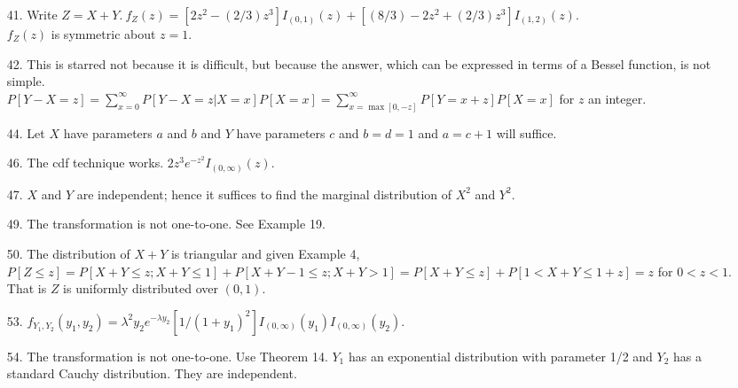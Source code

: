 \begin{enumerate}
	\item[41.] Write $Z=X+Y.\ f_Z(z) = [2z^2-(2/3)z^3]I_{(0,1)}(z) + [(8/3)-2z^2+(2/3)z^3]I_{(1,2)}(z)$. \\
	$f_Z(z)$ is symmetric about $z=1$.
	
	\item[42.] This is starred not because it is difficult, but because the answer, which can be expressed in terms of a Bessel function, is not simple. \\
	$P[Y-X=z] = \displaystyle\sum_{x=0}^{\infty}P[Y-X=z\vert X=x]P[X=x] = \sum_{x=\max[0,-z]}^{\infty} P[Y=x+z]P[X=x]$ for $z$ an integer.
	
	\newpage
	\item[44.] Let $X$ have parameters $a$ and $b$ and $Y$ have parameters $c$ and $b=d=1$ and $a=c+1$ will suffice.
	
	\item[46.] The cdf technique works. $2z^3e^{-z^2}I_{(0,\infty)}(z)$.
	
	\item[47.] $X$ and $Y$ are independent; hence it suffices to find the marginal distribution of $X^2$ and $Y^2$.
	
	\item[49.] The transformation is not one-to-one. See Example 19.
	
	\item[50.] The distribution of $X+Y$ is triangular and given Example 4, 
	$P[Z\le z] = P[X+Y\le z; X+Y\le 1] + P[X+Y-1\le z; X+Y>1] = P[X+Y\le z] + P[1<X+Y\le 1+z] = z$ for $0<z<1$. That is $Z$ is uniformly distributed over $(0,1)$.
	
	\item[53.] $f_{Y_1,Y_2}(y_1,y_2) = \lambda^2y_2e^{-\lambda y_2}[1/(1+y_1)^2]I_{(0,\infty)}(y_1)I_{(0,\infty)}(y_2)$.
	
	\item[54.] The transformation is not one-to-one.  Use Theorem 14. $Y_1$ has an exponential distribution with parameter 1/2 and $Y_2$ has a standard Cauchy distribution.  They are independent.	
	

\end{enumerate}
